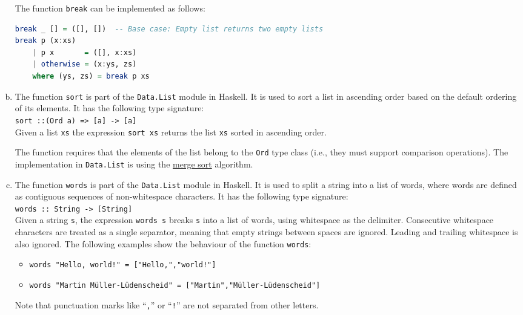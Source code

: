 \begin{enumerate}[(a)]
    The function \texttt{break} can be implemented as follows:
\begin{lstlisting}[style=haskellstyle, language=Haskell]
break _ [] = ([], [])  -- Base case: Empty list returns two empty lists
break p (x:xs)
    | p x       = ([], x:xs) 
    | otherwise = (x:ys, zs) 
    where (ys, zs) = break p xs
\end{lstlisting}
\item The function \texttt{sort} is part of the \texttt{Data.List} module in Haskell. It is used to sort a list
      in ascending order based on the default ordering of its elements.  It has the following type signature:
      \\[0.2cm]
      \hspace*{1.3cm}
      \texttt{sort ::\;(Ord a) => [a] -> [a]}
      \\[0.2cm]
      Given a list \texttt{xs} the expression \texttt{sort xs} returns the list \texttt{xs} sorted in ascending
      order.
    
      The function requires that the elements of the list belong to the \texttt{Ord} type class (i.e., they must
      support comparison operations).  The implementation in \texttt{Data.List} is using the
      \href{https://en.wikipedia.org/wiki/Merge_sort}{merge sort} algorithm.
\item The function \texttt{words} is part of the \texttt{Data.List} module in Haskell. It is used to split a
      string into a list of words, where words are defined as contiguous sequences of non-whitespace characters. 
      It has the following type signature:
      \\[0.2cm]
      \hspace*{1.3cm}
      \texttt{words :: String -> [String]}
      \\[0.2cm]
      Given a string \texttt{s}, the expression \texttt{words s} breaks \texttt{s} into a list of words, using
      whitespace as the delimiter.  Consecutive whitespace characters are treated as a single separator,
      meaning that empty strings between spaces are ignored.  Leading and trailing whitespace is also ignored.
      The following examples show the behaviour of the function \texttt{words}:
      \begin{itemize}
      \item \texttt{words "Hello, world!" = ["Hello,","world!"]}
      \item \texttt{words "Martin Müller-Lüdenscheid" = ["Martin","Müller-Lüdenscheid"]}
      \end{itemize}
      Note that punctuation marks like ``\texttt{,}'' or ``\texttt{!}'' are not separated from other letters.


\end{enumerate}

